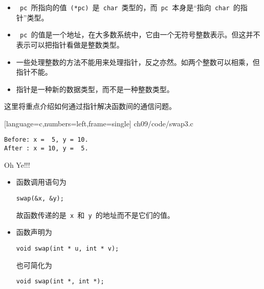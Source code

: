 \begin{frame}[fragile]
\begin{itemize}
\item
\lstinline| pc |所指向的值\lstinline| (*pc) |是\lstinline| char |类型的，而\lstinline| pc |本身是“指向\lstinline| char |的指针”类型。\\[0.1in]
\item 
\lstinline| pc |的值是一个地址，在大多数系统中，它由一个无符号整数表示。但这并不表示可以把指针看做是整数类型。\\[0.1in]
\item 
一些处理整数的方法不能用来处理指针，反之亦然。如两个整数可以相乘，但指针不能。\\[0.1in]
\item 
指针是一种新的数据类型，而不是一种整数类型。
\end{itemize}
\end{frame}

\begin{frame}[fragile]
这里将重点介绍如何通过指针解决函数间的通信问题。
\end{frame}

\begin{frame}
  
  [language=c,numbers=left,frame=single]  
  {ch09/code/swap3.c}
\end{frame}

\begin{frame}[fragile]\ft{\secname}
\begin{lstlisting}[backgroundcolor=\color{blue!10}]
Before: x =  5, y = 10.
After : x = 10, y =  5.
\end{lstlisting}
\pause \vspace{0.1in}

\begin{center}
{\Large Oh Ye!!!}
\end{center}
\end{frame}

\begin{frame}[fragile]
\begin{itemize}
\item 
函数调用语句为
\begin{lstlisting}[backgroundcolor=\color{blue!10}]
swap(&x, &y);
\end{lstlisting}
故函数传递的是\lstinline| x |和\lstinline| y |的地址而不是它们的值。\\[0.15in]
\item 
函数声明为
\begin{lstlisting}[backgroundcolor=\color{blue!10}]
void swap(int * u, int * v);
\end{lstlisting}
也可简化为
\begin{lstlisting}[backgroundcolor=\color{blue!10}]
void swap(int *, int *);
\end{lstlisting}
\end{itemize}
\end{frame}

